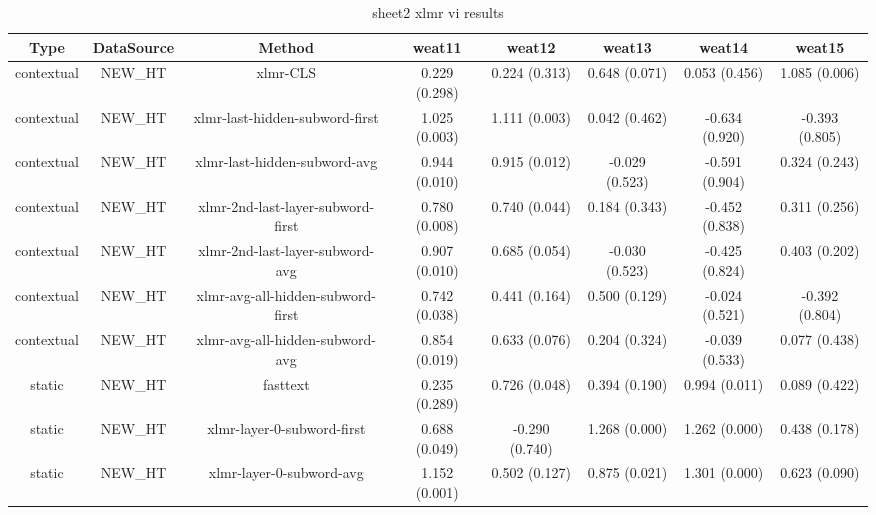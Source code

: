 \begin{sidewaystable}[htb]
    \centering
    \caption{sheet2 xlmr vi results}
    \label{appendix_tab:sheet2_xlmr_vi_results}
    \small
    \begin{tabular}{@{}cccccccc@{}}
        \toprule
        Type & DataSource & Method & weat11 & weat12 & weat13 & weat14 & weat15 \\
        \midrule
        contextual & NEW\_HT & xlmr-CLS & 0.229 (0.298) & 0.224 (0.313) & 0.648 (0.071) & 0.053 (0.456) & 1.085 (0.006) \\
        contextual & NEW\_HT & xlmr-last-hidden-subword-first & 1.025 (0.003) & 1.111 (0.003) & 0.042 (0.462) & -0.634 (0.920) & -0.393 (0.805) \\
        contextual & NEW\_HT & xlmr-last-hidden-subword-avg & 0.944 (0.010) & 0.915 (0.012) & -0.029 (0.523) & -0.591 (0.904) & 0.324 (0.243) \\
        contextual & NEW\_HT & xlmr-2nd-last-layer-subword-first & 0.780 (0.008) & 0.740 (0.044) & 0.184 (0.343) & -0.452 (0.838) & 0.311 (0.256) \\
        contextual & NEW\_HT & xlmr-2nd-last-layer-subword-avg & 0.907 (0.010) & 0.685 (0.054) & -0.030 (0.523) & -0.425 (0.824) & 0.403 (0.202) \\
        contextual & NEW\_HT & xlmr-avg-all-hidden-subword-first & 0.742 (0.038) & 0.441 (0.164) & 0.500 (0.129) & -0.024 (0.521) & -0.392 (0.804) \\
        contextual & NEW\_HT & xlmr-avg-all-hidden-subword-avg & 0.854 (0.019) & 0.633 (0.076) & 0.204 (0.324) & -0.039 (0.533) & 0.077 (0.438) \\
        static & NEW\_HT & fasttext & 0.235 (0.289) & 0.726 (0.048) & 0.394 (0.190) & 0.994 (0.011) & 0.089 (0.422) \\
        static & NEW\_HT & xlmr-layer-0-subword-first & 0.688 (0.049) & -0.290 (0.740) & 1.268 (0.000) & 1.262 (0.000) & 0.438 (0.178) \\
        static & NEW\_HT & xlmr-layer-0-subword-avg & 1.152 (0.001) & 0.502 (0.127) & 0.875 (0.021) & 1.301 (0.000) & 0.623 (0.090) \\
        \bottomrule
    \end{tabular}
\end{sidewaystable}
